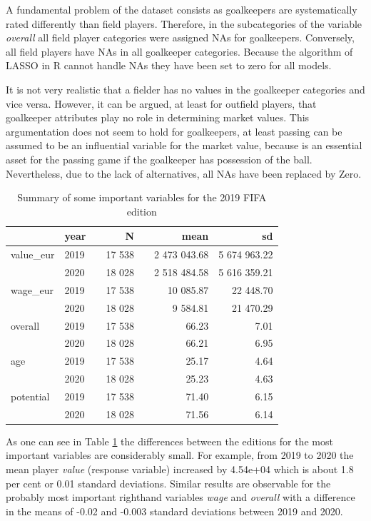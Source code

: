 \documentclass[12pt,a4paper]{article}
\begin{document}
A fundamental problem of the dataset consists as goalkeepers are
systematically rated differently than field players. Therefore, in the
subcategories of the variable \emph{overall} all field player categories
were assigned NAs for goalkeepers. Conversely, all field players have
NAs in all goalkeeper categories. Because the algorithm of \ac{LASSO} in
R cannot handle NAs they have been set to zero for all models.

It is not very realistic that a fielder has no values in the goalkeeper
categories and vice versa. However, it can be argued, at least for
outfield players, that goalkeeper attributes play no role in determining
market values. This argumentation does not seem to hold for goalkeepers,
at least passing can be assumed to be an influential variable for the
market value, because is an essential asset for the passing game if the
goalkeeper has possession of the ball. Nevertheless, due to the lack of
alternatives, all NAs have been replaced by Zero.

\begin{table}[!h]

\caption{\label{tab:data}\label{tab:sum} Summary of some important variables for the 2019 FIFA edition}
\centering
\begin{tabular}[t]{lllrlrr}
\toprule
 & year &  & N &   & mean & sd\\
\midrule
\rowcolor{gray!6}  value\_eur & 2019 &  & 17 538 &  & 2 473 043.68 & 5 674 963.22\\
 & 2020 &  & 18 028 &  & 2 518 484.58 & 5 616 359.21\\
\rowcolor{gray!6}  wage\_eur & 2019 &  & 17 538 &  & 10 085.87 & 22 448.70\\
 & 2020 &  & 18 028 &  & 9 584.81 & 21 470.29\\
\rowcolor{gray!6}  overall & 2019 &  & 17 538 &  & 66.23 & 7.01\\
 & 2020 &  & 18 028 &  & 66.21 & 6.95\\
\rowcolor{gray!6}  age & 2019 &  & 17 538 &  & 25.17 & 4.64\\
 & 2020 &  & 18 028 &  & 25.23 & 4.63\\
\rowcolor{gray!6}  potential & 2019 &  & 17 538 &  & 71.40 & 6.15\\
 & 2020 &  & 18 028 &  & 71.56 & 6.14\\
\bottomrule
\end{tabular}
\end{table}

As one can see in Table \ref{tab:sum} the differences between the
editions for the most important variables are considerably small. For
example, from 2019 to 2020 the mean player \emph{value} (response
variable) increased by 4.54e+04 which is about 1.8 per cent or 0.01
standard deviations. Similar results are observable for the probably
most important righthand variables \emph{wage} and \emph{overall} with a
difference in the means of -0.02 and -0.003 standard deviations between
2019 and 2020.
\end{document}
